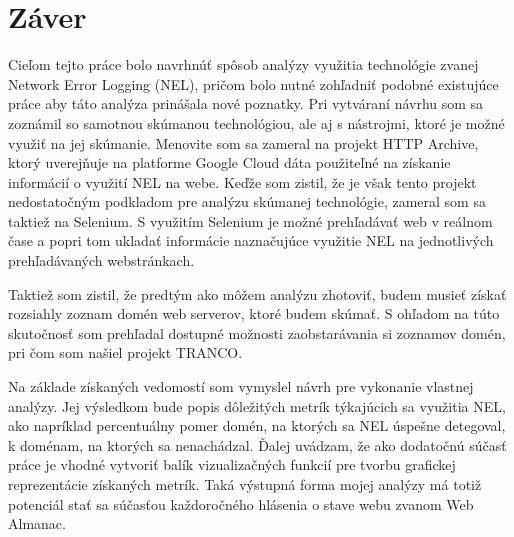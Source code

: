 \chapter{Záver}
\label{zaver}

Cieľom tejto práce bolo navrhnúť spôsob analýzy využitia technológie zvanej Network Error Logging (NEL), pričom bolo nutné zohľadniť podobné existujúce práce aby táto analýza prinášala nové poznatky.
Pri vytváraní návrhu som sa zoznámil so samotnou skúmanou technológiou, ale aj s nástrojmi, ktoré je možné využiť na jej skúmanie.
Menovite som sa zameral na projekt HTTP Archive, ktorý uverejňuje na platforme Google Cloud dáta použiteľné na získanie informácií o využití NEL na webe.
Keďže som zistil, že je však tento projekt nedostatočným podkladom pre analýzu skúmanej technológie, zameral som sa taktiež na Selenium.
S využitím Selenium je možné prehľadávať web v reálnom čase a popri tom ukladať informácie naznačujúce využitie NEL na jednotlivých prehľadávaných webstránkach.

Taktiež som zistil, že predtým ako môžem analýzu zhotoviť, budem musieť získať rozsiahly zoznam domén web serverov, ktoré budem skúmať. 
S ohľadom na túto skutočnosť som prehľadal dostupné možnosti zaobstarávania si zoznamov domén, pri čom som našiel projekt TRANCO.

Na základe získaných vedomostí som vymyslel návrh pre vykonanie vlastnej analýzy.
Jej výsledkom bude popis dôležitých metrík týkajúcich sa využitia NEL, ako napríklad percentuálny pomer domén, na ktorých sa NEL úspešne detegoval, k doménam, na ktorých sa nenachádzal.
Ďalej uvádzam, že ako dodatočnú súčasť práce je vhodné vytvoriť balík vizualizačných funkcií pre tvorbu grafickej reprezentácie získaných metrík.
Taká výstupná forma mojej analýzy má totiž potenciál stať sa súčasťou každoročného hlásenia o stave webu zvanom Web Almanac. 
